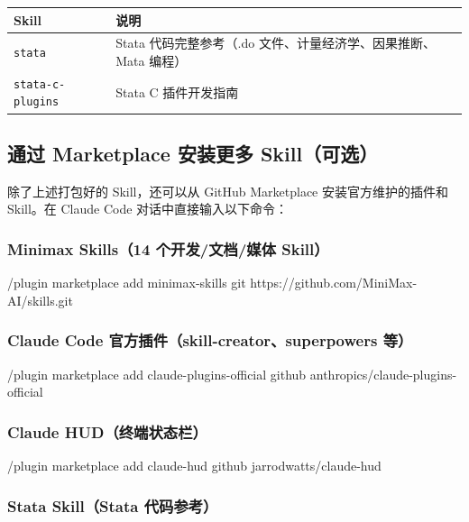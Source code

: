 \documentclass[12pt,a4paper]{ctexart}
\begin{document}
{
\centering
\small
\begin{tabular}{>{\RaggedRight\arraybackslash}p{5.2cm}>{\RaggedRight\arraybackslash}p{9.3cm}}
\toprule
\textbf{Skill} & \textbf{说明} \\
\midrule
\texttt{stata} & Stata 代码完整参考（.do 文件、计量经济学、因果推断、Mata 编程） \\
\midrule
\texttt{stata-c-plugins} & Stata C 插件开发指南 \\
\bottomrule
\end{tabular}
\par}

\subsection{通过 Marketplace 安装更多 Skill（可选）}

除了上述打包好的 Skill，还可以从 GitHub Marketplace 安装官方维护的插件和 Skill。在 Claude Code 对话中直接输入以下命令：

\subsubsection*{Minimax Skills（14 个开发/文档/媒体 Skill）}

\begin{shcode}
/plugin marketplace add minimax-skills git https://github.com/MiniMax-AI/skills.git
\end{shcode}

\subsubsection*{Claude Code 官方插件（skill-creator、superpowers 等）}

\begin{shcode}
/plugin marketplace add claude-plugins-official github anthropics/claude-plugins-official
\end{shcode}

\subsubsection*{Claude HUD（终端状态栏）}

\begin{shcode}
/plugin marketplace add claude-hud github jarrodwatts/claude-hud
\end{shcode}

\subsubsection*{Stata Skill（Stata 代码参考）}
\end{document}
